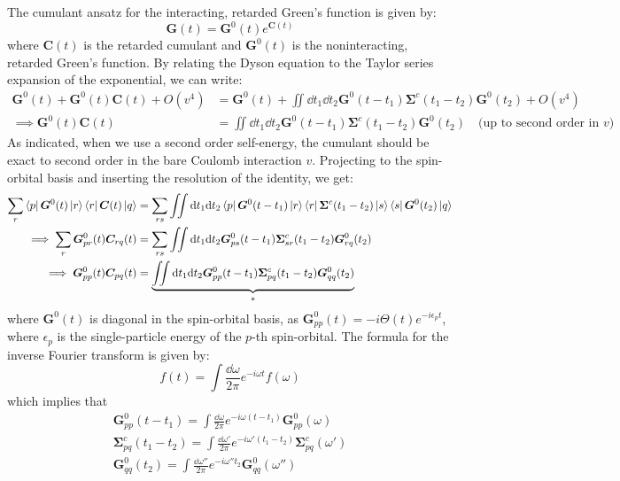 The cumulant ansatz for the interacting, retarded Green's function is given by:
\begin{equation}
    \bm{G}(t) = \bm{G}^0(t)e^{\bm{C}(t)}
\end{equation}
where $\bm{C}(t)$ is the retarded cumulant and $\bm{G}^0(t)$ is the noninteracting, retarded Green's function. By relating the Dyson equation to the Taylor series expansion of the exponential, we can write:
\begin{align}
\bm{G}^0(t) + \bm{G}^0(t) \bm{C}(t) + O(v^4) &= \bm{G}^0(t) + \iint \dd t_1 \dd t_2 \bm{G}^0(t-t_1) \bm{\Sigma}^c(t_1 - t_2) \bm{G}^0(t_2) + O(v^4) \\
    \implies \bm{G}^0(t) \bm{C}(t) &= \iint \dd t_1 \dd t_2 \bm{G}^0(t-t_1) \bm{\Sigma}^c(t_1 - t_2) \bm{G}^0(t_2) \quad \text{(up to second order in $v$)}
\end{align}
{As indicated, when we use a second order self-energy, the cumulant should be exact to second order in the bare Coulomb interaction $v$.}
Projecting to the spin-orbital basis and inserting the resolution of the identity, we get:
\begin{align}
    \sum_{r}\bra{p}\bm{G}^0(t) \ket{r}\bra{r}\bm{C}(t)\ket{q} &= \sum_{rs}\iint \dd t_1 \dd t_2 \bra{p}\bm{G}^0(t-t_1)\ket{r} \bra{r}\bm{\Sigma}^c(t_1 - t_2)\ket{s} \bra{s}\bm{G}^0(t_2)\ket{q} \\
    \implies \sum_{r}\bm{G}_{pr}^0(t) \bm{C}_{rq}(t) &= \sum_{rs}\iint \dd t_1 \dd t_2 \bm{G}_{ps}^0(t-t_1) \bm{\Sigma}_{sr}^c(t_1 - t_2) \bm{G}_{rq}^0(t_2)\\
    \implies \bm{G}_{pp}^{0}(t) \bm{C}_{pq}(t) &= \underbrace{\iint \dd t_1 \dd t_2 \bm{G}_{pp}^{0}(t-t_1) \bm{\Sigma}_{pq}^c(t_1 - t_2) \bm{G}_{qq}^{0}(t_2)}_{*}
    \label{eqn:cumulant_connection}
\end{align}
where $\bm{G}^0(t)$ is diagonal in the spin-orbital basis, as $\bm{G}_{pp}^{0}(t) = -i\Theta(t)e^{-i\epsilon_p t}$, where $\epsilon_p$ is the single-particle energy of the $p$-th spin-orbital.
The formula for the inverse Fourier transform is given by:
\begin{equation}
    f(t) = \int \frac{\dd \omega}{2\pi} e^{-i\omega t} f(\omega)
\end{equation}
which implies that
\begin{align}
    \bm{G}_{pp}^{0}(t-t_1) = \int \frac{\dd \omega}{2\pi} e^{-i\omega (t-t_1)} \bm{G}_{pp}^{0}(\omega)\\
    \bm{\Sigma}_{pq}^c(t_1 - t_2) = \int \frac{\dd \omega'}{2\pi} e^{-i\omega' (t_1 - t_2)} \bm{\Sigma}_{pq}^c(\omega')\\
    \bm{G}_{qq}^{0}(t_2) = \int \frac{\dd \omega''}{2\pi} e^{-i\omega'' t_2} \bm{G}_{qq}^{0}(\omega'')
\end{align}
